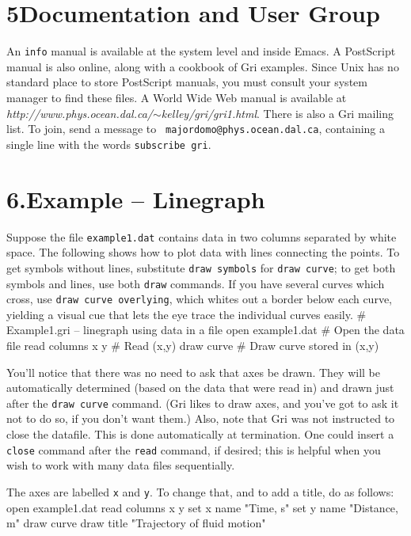 \section{5\quad Documentation and User Group}
An {\tt info} manual is available at the system level and inside
Emacs.  A PostScript manual is also online, along with a cookbook of
Gri examples.  Since Unix has no standard place to store PostScript
manuals, you must consult your system manager to find these files.  A
World Wide Web manual is available at {\it
  http://www.phys.ocean.dal.ca/}$\sim${\it kelley/gri/gri1.html}.
There is also a Gri mailing list.  To join, send a message to {\tt
  majordomo@phys.ocean.dal.ca}, containing a single line with the
words {\tt subscribe gri}.



\section{6.\quad Example -- Linegraph}
Suppose the file {\tt example1.dat} contains data in two columns
separated by white space.  The following shows how to plot data with
lines connecting the points.  To get symbols without lines, substitute
{\tt draw symbols} for {\tt draw curve}; to get both symbols and
lines, use both {\tt draw} commands.  If you have several curves which
cross, use {\tt draw curve overlying}, which whites out a border below
each curve, yielding a visual cue that lets the eye trace the
individual curves easily.
\beginexample
\# Example1.gri -- linegraph using data in a file
open example1.dat      \# Open the data file
read columns x y       \# Read (x,y)
draw curve             \# Draw curve stored in (x,y)
\endexample

You'll notice that there was no need to ask that axes be drawn.  They
will be automatically determined (based on the data that were read in)
and drawn just after the {\tt draw curve} command.  (Gri likes to draw
axes, and you've got to ask it not to do so, if you don't want them.)
Also, note that Gri was not instructed to close the datafile.  This is
done automatically at termination.  One could insert a {\tt close}
command after the {\tt read} command, if desired; this is helpful when
you wish to work with many data files sequentially.

The axes are labelled {\tt x} and {\tt y}.  To change that, and to add
a title, do as follows:
\beginexample
open example1.dat
read columns x y
set x name "Time, s"
set y name "Distance, m"
draw curve
draw title "Trajectory of fluid motion"
\endexample


